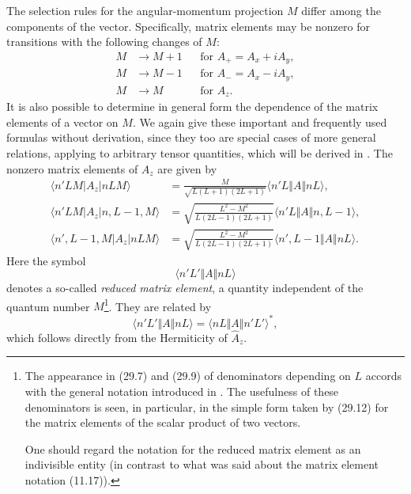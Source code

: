The selection rules for the angular-momentum projection $M$ differ among the
components of the vector. Specifically, matrix elements may be nonzero for
transitions with the following changes of $M$:
\begin{equation}
 \begin{aligned}
  M&\to M+1 &&\text{for } A_+=A_x+iA_y,\\
  M&\to M-1 &&\text{for } A_-=A_x-iA_y,\\
  M&\to M   &&\text{for } A_z.
 \end{aligned}
 \tag{29.6}
\end{equation}
It is also possible to determine in general form the dependence of the matrix
elements of a vector on $M$. We again give these important and frequently
used formulas without derivation, since they too are special cases of more
general relations, applying to arbitrary tensor quantities, which will be
derived in .
The nonzero matrix elements of $A_z$ are given by
\begin{equation}
 \begin{aligned}
 \langle n'LM|A_z|nLM\rangle
 &=\frac{M}{\sqrt{L(L+1)(2L+1)}}\langle n'L\Vert A\Vert nL\rangle,\\
 \langle n'LM|A_z|n,L-1,M\rangle
 &=\sqrt{\frac{L^2-M^2}{L(2L-1)(2L+1)}}
   \langle n'L\Vert A\Vert n,L-1\rangle,\\
 \langle n',L-1,M|A_z|nLM\rangle
 &=\sqrt{\frac{L^2-M^2}{L(2L-1)(2L+1)}}
   \langle n',L-1\Vert A\Vert nL\rangle.
 \end{aligned}
 \tag{29.7}
\end{equation}
\enlargethispage{.4\baselineskip}
Here the symbol
\[
  \langle n'L'\Vert A\Vert nL\rangle
\]
denotes a so-called \emph{reduced matrix element}, a quantity independent of
the quantum number $M$\footnote{The appearance in (29.7) and (29.9) of
denominators depending on $L$ accords with the general notation introduced in
. The usefulness of these denominators is seen, in particular, in the
simple form taken by (29.12) for the matrix elements of the scalar product of
two vectors.

One should regard the notation for the reduced matrix element as an indivisible entity
(in contrast to what was said about the matrix element notation (11.17)).}.
They are related by
\begin{equation}
 \langle n'L'\Vert A\Vert nL\rangle
 =\langle nL\Vert A\Vert n'L'\rangle^*,
 \tag{29.8}
\end{equation}
which follows directly from the Hermiticity of $\hat A_z$.

